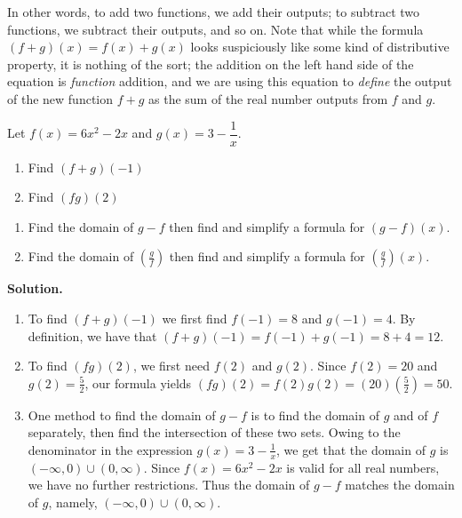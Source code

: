 In other words, to add two functions, we add their outputs;  to subtract two functions, we subtract their outputs, and so on.  Note that while the formula $(f+g)(x) = f(x) + g(x)$ looks suspiciously like some kind of distributive property, it is nothing of the sort;  the addition on the left hand side of the equation is \textit{function} addition, and we are using this equation to \textit{define} the output of the new function $f+g$ as the sum of the real number outputs from $f$ and $g$.

\begin{ex}  \label{funcarithex} Let $f(x) = 6x^2 - 2x$ and $g(x) = 3-\dfrac{1}{x}$.  


\begin{multicols}{2}
\begin{enumerate}

\item Find  $(f+g)(-1)$

\item Find $(fg)(2)$

\setcounter{HW}{\value{enumi}}
\end{enumerate}

\end{multicols}

\begin{enumerate}
\setcounter{enumi}{\value{HW}}

\item  Find the domain of $g-f$ then find and simplify a formula for  $(g-f)(x)$.

\item  \label{quotdomainex} Find the domain of $\left(\frac{g}{f}\right)$ then find and simplify a formula for  $\left(\frac{g}{f}\right)(x)$.

\end{enumerate}

{\bf Solution.}  

\begin{enumerate}

\item  To find $(f+g)(-1)$ we first find $f(-1) = 8$ and $g(-1) = 4$. By definition, we have that $(f+g)(-1) = f(-1) + g(-1) = 8+4 = 12$.


\item To find $(fg)(2)$, we first need $f(2)$ and $g(2)$. Since $f(2) = 20$ and $g(2) = \frac{5}{2}$, our formula yields $(fg)(2) = f(2) g(2) = (20)\left(\frac{5}{2}\right) = 50$.

\item One method to find the domain of $g-f$ is to find the domain of $g$ and of $f$ separately, then find the intersection of these two sets.  Owing to the denominator in the expression $g(x) = 3 - \frac{1}{x}$, we get that the domain of $g$ is $(-\infty, 0) \cup (0, \infty)$.  Since $f(x) = 6x^2-2x$ is valid for all real numbers, we have no further restrictions.  Thus the domain of $g-f$ matches the domain of $g$, namely, $(-\infty, 0) \cup (0, \infty)$.


\end{enumerate}
\end{ex}
